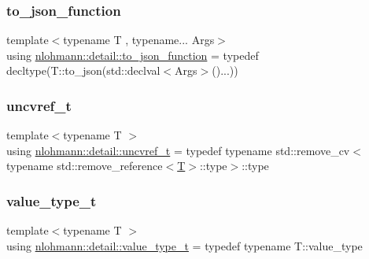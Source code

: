 \mbox{\label{namespacenlohmann_1_1detail_af846b6cf2f926009ff3a7a61495ca383}} 
\subsubsection{\texorpdfstring{to\_json\_function}{to\_json\_function}}
{\footnotesize\ttfamily template$<$typename T , typename... Args$>$ \\
using \mbox{\hyperlink{namespacenlohmann_1_1detail_af846b6cf2f926009ff3a7a61495ca383}{nlohmann\+::detail\+::to\+\_\+json\+\_\+function}} = typedef decltype(T\+::to\+\_\+json(std\+::declval$<$Args$>$()...))}

\mbox{\label{namespacenlohmann_1_1detail_a53a082eedad9f4729fcd8fed552a21f7}} 
\subsubsection{\texorpdfstring{uncvref\_t}{uncvref\_t}}
{\footnotesize\ttfamily template$<$typename T $>$ \\
using \mbox{\hyperlink{namespacenlohmann_1_1detail_a53a082eedad9f4729fcd8fed552a21f7}{nlohmann\+::detail\+::uncvref\+\_\+t}} = typedef typename std\+::remove\+\_\+cv$<$typename std\+::remove\+\_\+reference$<$\mbox{\hyperlink{_keyboard_event_8h_adf1f3edb9115acb0a1e04209b7a9937b}{T}}$>$\+::type$>$\+::type}

\mbox{\label{namespacenlohmann_1_1detail_af91beae90c2fb0f931079b3d50a343bc}} 
\subsubsection{\texorpdfstring{value\_type\_t}{value\_type\_t}}
{\footnotesize\ttfamily template$<$typename T $>$ \\
using \mbox{\hyperlink{namespacenlohmann_1_1detail_af91beae90c2fb0f931079b3d50a343bc}{nlohmann\+::detail\+::value\+\_\+type\+\_\+t}} = typedef typename T\+::value\+\_\+type}


